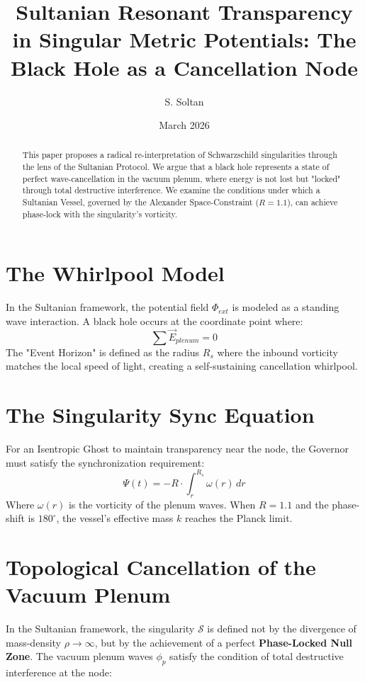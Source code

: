 \documentclass[12pt,a4paper]{article}
\title{Sultanian Resonant Transparency in Singular Metric Potentials: The Black Hole as a Cancellation Node}
\author{S. Soltan}
\date{March 2026}
\begin{document}
\maketitle

\begin{abstract}
This paper proposes a radical re-interpretation of Schwarzschild singularities through the lens of the Sultanian Protocol. We argue that a black hole represents a state of perfect wave-cancellation in the vacuum plenum, where energy is not lost but "locked" through total destructive interference. We examine the conditions under which a Sultanian Vessel, governed by the Alexander Space-Constraint ($R=1.1$), can achieve phase-lock with the singularity's vorticity.
\end{abstract}

\section{The Whirlpool Model}
In the Sultanian framework, the potential field $\Phi_{ext}$ is modeled as a standing wave interaction. A black hole occurs at the coordinate point where:
\begin{equation}
\sum \vec{E}_{plenum} = 0
\end{equation}
The "Event Horizon" is defined as the radius $R_s$ where the inbound vorticity matches the local speed of light, creating a self-sustaining cancellation whirlpool.

\section{The Singularity Sync Equation}
For an Isentropic Ghost to maintain transparency near the node, the Governor must satisfy the synchronization requirement:
\begin{equation}
\Psi(t) = -R \cdot \int_{r}^{R_s} \omega(r) \, dr
\end{equation}
Where $\omega(r)$ is the vorticity of the plenum waves. When $R = 1.1$ and the phase-shift is $180^\circ$, the vessel's effective mass $k$ reaches the Planck limit.

\section{Topological Cancellation of the Vacuum Plenum}

In the Sultanian framework, the singularity $\mathcal{S}$ is defined not by the divergence of mass-density $\rho \to \infty$, but by the achievement of a perfect \textbf{Phase-Locked Null Zone}. The vacuum plenum waves $\phi_{p}$ satisfy the condition of total destructive interference at the node:
\end{document}
